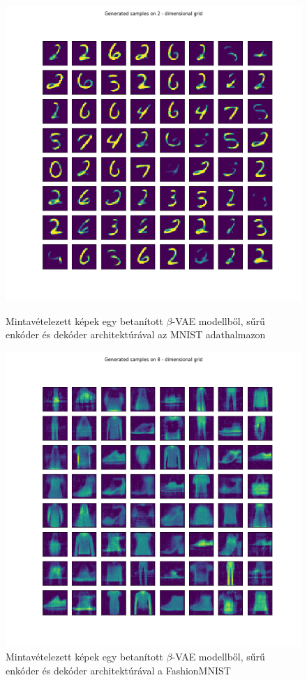 \documentclass[12pt, english]{article}
\begin{document}
\begin{figure}[H] 
  \begin{minipage}{0.48\linewidth}
    \centering
    \includegraphics[width=.65\linewidth]{gen/generated_samples_mnist_dense_vae.png}
    \caption{Mintavételezett képek egy betanított $\beta$-VAE modellből, sűrű enkóder és dekóder architektúrával az MNIST adathalmazon}
    \label{fig:sampled-images-1}
  \end{minipage}\hfill
  \begin{minipage}{0.48\linewidth}
    \centering
    \includegraphics[width=.65\linewidth]{gen/generated_samples_fashion_mnist_dense_vae.png} 
    \caption{Mintavételezett képek egy betanított $\beta$-VAE modellből, sűrű enkóder és dekóder architektúrával a FashionMNIST} 
    \label{fig:sampled-images-2}
  \end{minipage} 
\end{figure}
\end{document}
